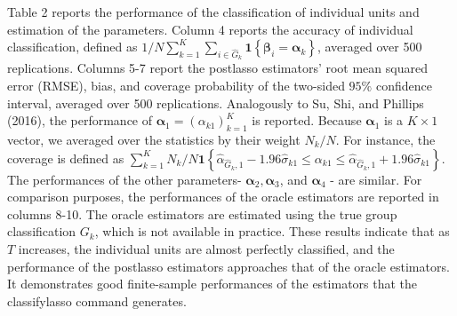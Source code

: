 \documentclass[10pt]{article}
\begin{document}
Table 2 reports the performance of the classification of individual units and estimation of the parameters. Column 4 reports the accuracy of individual classification, defined as $1 / N \sum_{k=1}^{K} \sum_{i \in \widehat{G}_{k}} \mathbf{1}\left\{\boldsymbol{\beta}_{i}=\boldsymbol{\alpha}_{k}\right\}$, averaged over 500 replications. Columns 5-7 report the postlasso estimators' root mean squared error (RMSE), bias, and coverage probability of the two-sided $95 \%$ confidence interval, averaged over 500 replications. Analogously to Su, Shi, and Phillips (2016), the performance of $\boldsymbol{\alpha}_{1}=\left(\alpha_{k 1}\right)_{k=1}^{K}$ is reported. Because $\boldsymbol{\alpha}_{1}$ is a $K \times 1$ vector, we averaged over the statistics by their weight $N_{k} / N$. For instance, the coverage is defined as $\sum_{k=1}^{K} N_{k} / N \mathbf{1}\left\{\widehat{\alpha}_{\widehat{G}_{k}, 1}-1.96 \widehat{\sigma}_{k 1} \leq \alpha_{k 1} \leq\right. \left.\widehat{\alpha}_{\widehat{G}_{k}, 1}+1.96 \widehat{\sigma}_{k 1}\right\}$. The performances of the other parameters- $\boldsymbol{\alpha}_{2}, \boldsymbol{\alpha}_{3}$, and $\boldsymbol{\alpha}_{4}$ - are similar. For comparison purposes, the performances of the oracle estimators are reported in columns 8-10. The oracle estimators are estimated using the true group classification $G_{k}$, which is not available in practice. These results indicate that as $T$ increases, the individual units are almost perfectly classified, and the performance of the postlasso estimators approaches that of the oracle estimators. It demonstrates good finite-sample performances of the estimators that the classifylasso command generates.
\end{document}
